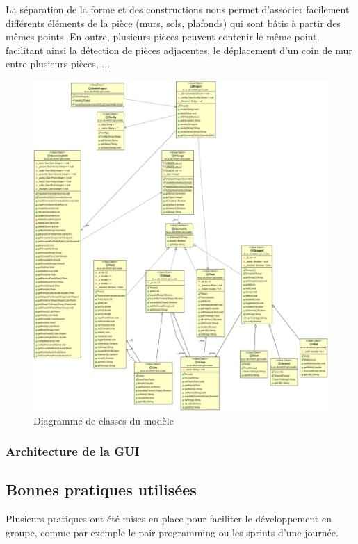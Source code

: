 	La séparation de la forme et des constructions nous permet d'associer
	facilement différents éléments de la pièce (murs, sols, plafonds) qui sont
	bâtis à partir des mêmes points. En outre, plusieurs pièces peuvent contenir
	le même point, facilitant ainsi la détection de pièces adjacentes, le
	déplacement d'un coin de mur entre plusieurs pièces, ...

	\begin{figure}[h!]
		\includegraphics[width=\textwidth]{uml/models.png}
		\caption{\label{fig:models:classdiagram} Diagramme de classes du modèle}
	\end{figure}

	\subsubsection{Architecture de la GUI}

\subsection{Bonnes pratiques utilisées}
Plusieurs pratiques ont été mises en place pour faciliter le développement en 
groupe, comme par exemple le pair programming ou les sprints d'une journée.

